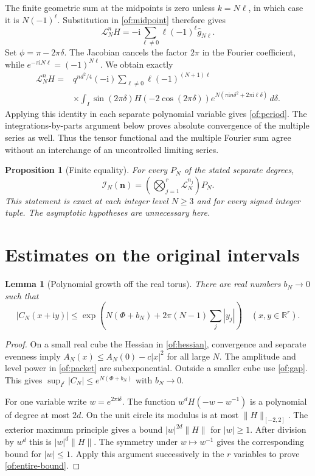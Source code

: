 \documentclass[11pt]{article}
\numberwithin{equation}{section}
\newtheorem{proposition}[theorem]{Proposition}
\newtheorem{lemma}[theorem]{Lemma}
\theoremstyle{definition}\newtheorem{definition}[theorem]{Definition}
\theoremstyle{remark}\newtheorem{remark}[theorem]{Remark}
\newcommand{\ii}{\mathrm i}
\begin{document}
The finite geometric sum at the midpoints is zero unless $k=N\ell$,
in which case it is $N(-1)^\ell$. Substitution in
\eqref{of:midpoint} therefore gives
\[
                  \mathcal L_N^nH
                   =-\ii\sum_{\ell\ne0}\ell(-1)^\ell\widehat g_{N\ell}.
\]
Set $\phi=\pi-2\pi\delta$. The Jacobian cancels the factor $2\pi$
in the Fourier coefficient, while
$e^{-\pi\ii N\ell}=(-1)^{N\ell}$. We obtain exactly
\begin{equation}\label{of:one-fourier}
\begin{split}
 \mathcal L_N^nH={}&q^{nd^2/4}(-\ii)
       \sum_{\ell\ne0}\ell(-1)^{(N+1)\ell}\\
 &\times\int_I\sin(2\pi\delta)H(-2\cos(2\pi\delta))
               e^{N(\pi\ii n\delta^2+2\pi\ii\ell\delta)}\,d\delta.
\end{split}
\end{equation}
Applying this identity in each separate polynomial variable gives
\eqref{of:period}. The integrations-by-parts argument below proves
absolute convergence of the multiple series as well. Thus the tensor
functional and the multiple Fourier sum agree without an interchange
of an uncontrolled limiting series.

\begin{proposition}[Finite equality]\label{of:finite-equality}
For every $P_N$ of the stated separate degrees,
\[
 \mathcal I_N(\boldsymbol n)
           =\left(\bigotimes_{j=1}^r\mathcal L_N^{n_j}\right)P_N.
\]
This statement is exact at each integer level $N\ge3$ and for every
signed integer tuple. The asymptotic hypotheses are unnecessary here.
\end{proposition}

\section{Estimates on the original intervals}

\begin{lemma}[Polynomial growth off the real torus]\label{of:bernstein}
There are real numbers $b_N\to0$ such that
\begin{equation}\label{of:entire-bound}
 |C_N(x+\ii y)|\le
   \exp\left(N(\Phi+b_N)+2\pi(N-1)\sum_j|y_j|\right)
 \quad(x,y\in\mathbb R^r).
\end{equation}
\end{lemma}
\begin{proof}
On a small real cube the Hessian in \eqref{of:hessian}, convergence
and separate evenness imply $A_N(x)\le A_N(0)-c|x|^2$ for all large
$N$. The amplitude and level power in \eqref{of:packet} are
subexponential. Outside a smaller cube use \eqref{of:gap}. This gives
$\sup_{I^r}|C_N|\le e^{N(\Phi+b_N)}$ with $b_N\to0$.

For one variable write $w=e^{2\pi\ii\delta}$. The function
$w^dH(-w-w^{-1})$ is a polynomial of degree at most $2d$. On the unit
circle its modulus is at most $\|H\|_{[-2,2]}$. The exterior maximum
principle gives a bound $|w|^{2d}\|H\|$ for $|w|\ge1$. After division
by $w^d$ this is $|w|^d\|H\|$. The symmetry under $w\mapsto w^{-1}$
gives the corresponding bound for $|w|\le1$. Apply this argument
successively in the $r$ variables to prove \eqref{of:entire-bound}.
\end{proof}
\end{document}
